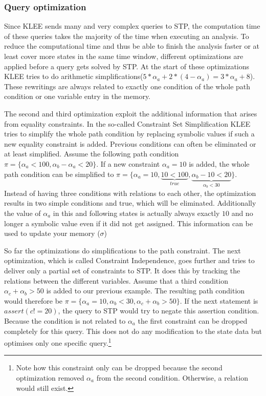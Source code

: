 \subsubsection{Query optimization}
Since KLEE sends many and very complex queries to STP, the computation time of these queries takes the majority of the time when executing an analysis. To reduce the computational time and thus be able to finish the analysis faster or at least cover more states in the same time window, different optimizations are applied before a query gets solved by STP. 
At the start of these optimizations KLEE tries to do arithmetic simplifications($5*\alpha_a + 2*(4-\alpha_a) = 3 * \alpha_a + 8$). These rewritings are always related to exactly one condition of the whole path condition or one variable entry in the memory.

The second and third optimization exploit the additional information that arises from equality constraints. In the so-called Constraint Set Simplification KLEE tries to simplify the whole path condition by replacing symbolic values if such a new equality constraint is added. Previous conditions can often be eliminated or at least simplified. 
Assume the following path condition $\pi = \{\alpha_a < 100, \alpha_b - \alpha_a< 20\}$. If a new constraint $\alpha_a = 10$ is added, the whole path condition can be simplified to $\pi = \{\alpha_a = 10, \underbrace{10 < 100}_{true},\underbrace{\alpha_b - 10 < 20}_{\alpha_b < 30}\}$. Instead of having three conditions with relations to each other, the optimization results in two simple conditions and true, which will be eliminated. Additionally the value of $\alpha_a$ in this and following states is actually always exactly $10$ and no longer a symbolic value even if it did not get assigned. This information can be used to update your memory ($\sigma$)

So far the optimizations do simplifications to the path constraint. The next optimization, which is called Constraint Independence, goes further and tries to deliver only a partial set of constraints to STP. It does this by tracking the relations between the different variables. Assume that a third condition $\alpha_c + \alpha_b > 50$ is added to our previous example. The resulting path condition would therefore be $\pi = \{\alpha_a = 10, \alpha_b < 30, \alpha_c + \alpha_b > 50\}$. If the next statement is $assert(c != 20)$, the query to STP would try to negate this assertion condition. Because the condition is not related to $\alpha_a$ the first constraint can be dropped completely for this query. This does not do any modification to the state data but optimises only one specific query.\footnote{Note how this constraint only can be dropped because the second optimization removed $\alpha_a$ from the second condition. Otherwise, a relation would still exist.}

